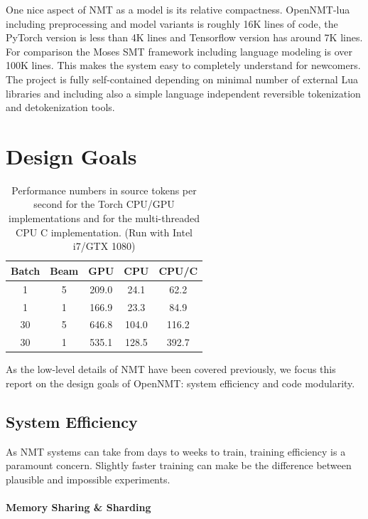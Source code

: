 \documentclass[]{article}
\begin{document}
One nice aspect of NMT as a model is its relative compactness.
OpenNMT-lua including preprocessing and model variants is roughly 16K lines of code,
the PyTorch version is less than 4K lines and Tensorflow version has around 7K lines. For comparison the Moses SMT framework
including language modeling is over 100K lines. This makes the system
easy to completely understand for newcomers. The project is fully
self-contained depending on minimal number of external Lua libraries
and including also a simple language independent reversible
tokenization and detokenization tools.


\section{Design Goals}

\begin{table}
  \centering
  \begin{tabular}{ccccc}
    \toprule
    Batch & Beam & GPU & CPU & CPU/C \\ 
    \midrule
    1  & 5 & 209.0 & 24.1 & 62.2\\
    1  & 1 & 166.9 & 23.3 & 84.9\\
    30 & 5 & 646.8 & 104.0 & 116.2\\
    30 & 1 & 535.1 & 128.5  & 392.7\\

    \bottomrule
  \end{tabular}

  \label{tab:cpu}
  \caption{\small Performance numbers in source tokens per second for the Torch CPU/GPU implementations and for 
  the  multi-threaded CPU C implementation. (Run with Intel i7/GTX 1080)}
\end{table}
As the low-level details of NMT have been covered previously, we focus
this report on the design goals of OpenNMT: system efficiency and code modularity.

\subsection{System Efficiency}

As NMT systems can take from days to weeks to train, training
efficiency is a paramount concern. Slightly faster training can make be the difference between
plausible and impossible experiments.

\paragraph{Memory Sharing \& Sharding}
\end{document}
